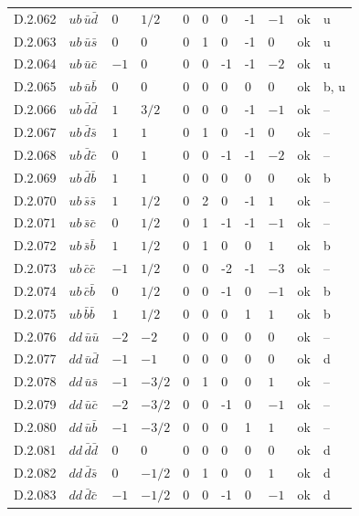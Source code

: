 {\begin{longtable}{@{}llllllllll>{\raggedright\arraybackslash}p{2.0cm}@{}}
D.2.062 & $ub\,\bar{u}\bar{d}$ & $0$ & $1/2$ & $0$ & 0 & 0 & -1 & $-1$ & ok & u \\
D.2.063 & $ub\,\bar{u}\bar{s}$ & $0$ & $0$ & $0$ & 1 & 0 & -1 & $0$ & ok & u \\
D.2.064 & $ub\,\bar{u}\bar{c}$ & $-1$ & $0$ & $0$ & 0 & -1 & -1 & $-2$ & ok & u \\
D.2.065 & $ub\,\bar{u}\bar{b}$ & $0$ & $0$ & $0$ & 0 & 0 & 0 & $0$ & ok & b, u \\
D.2.066 & $ub\,\bar{d}\bar{d}$ & $1$ & $3/2$ & $0$ & 0 & 0 & -1 & $-1$ & ok & -- \\
D.2.067 & $ub\,\bar{d}\bar{s}$ & $1$ & $1$ & $0$ & 1 & 0 & -1 & $0$ & ok & -- \\
D.2.068 & $ub\,\bar{d}\bar{c}$ & $0$ & $1$ & $0$ & 0 & -1 & -1 & $-2$ & ok & -- \\
D.2.069 & $ub\,\bar{d}\bar{b}$ & $1$ & $1$ & $0$ & 0 & 0 & 0 & $0$ & ok & b \\
D.2.070 & $ub\,\bar{s}\bar{s}$ & $1$ & $1/2$ & $0$ & 2 & 0 & -1 & $1$ & ok & -- \\
D.2.071 & $ub\,\bar{s}\bar{c}$ & $0$ & $1/2$ & $0$ & 1 & -1 & -1 & $-1$ & ok & -- \\
D.2.072 & $ub\,\bar{s}\bar{b}$ & $1$ & $1/2$ & $0$ & 1 & 0 & 0 & $1$ & ok & b \\
D.2.073 & $ub\,\bar{c}\bar{c}$ & $-1$ & $1/2$ & $0$ & 0 & -2 & -1 & $-3$ & ok & -- \\
D.2.074 & $ub\,\bar{c}\bar{b}$ & $0$ & $1/2$ & $0$ & 0 & -1 & 0 & $-1$ & ok & b \\
D.2.075 & $ub\,\bar{b}\bar{b}$ & $1$ & $1/2$ & $0$ & 0 & 0 & 1 & $1$ & ok & b \\
D.2.076 & $dd\,\bar{u}\bar{u}$ & $-2$ & $-2$ & $0$ & 0 & 0 & 0 & $0$ & ok & -- \\
D.2.077 & $dd\,\bar{u}\bar{d}$ & $-1$ & $-1$ & $0$ & 0 & 0 & 0 & $0$ & ok & d \\
D.2.078 & $dd\,\bar{u}\bar{s}$ & $-1$ & $-3/2$ & $0$ & 1 & 0 & 0 & $1$ & ok & -- \\
D.2.079 & $dd\,\bar{u}\bar{c}$ & $-2$ & $-3/2$ & $0$ & 0 & -1 & 0 & $-1$ & ok & -- \\
D.2.080 & $dd\,\bar{u}\bar{b}$ & $-1$ & $-3/2$ & $0$ & 0 & 0 & 1 & $1$ & ok & -- \\
D.2.081 & $dd\,\bar{d}\bar{d}$ & $0$ & $0$ & $0$ & 0 & 0 & 0 & $0$ & ok & d \\
D.2.082 & $dd\,\bar{d}\bar{s}$ & $0$ & $-1/2$ & $0$ & 1 & 0 & 0 & $1$ & ok & d \\
D.2.083 & $dd\,\bar{d}\bar{c}$ & $-1$ & $-1/2$ & $0$ & 0 & -1 & 0 & $-1$ & ok & d \\

\end{longtable}}
